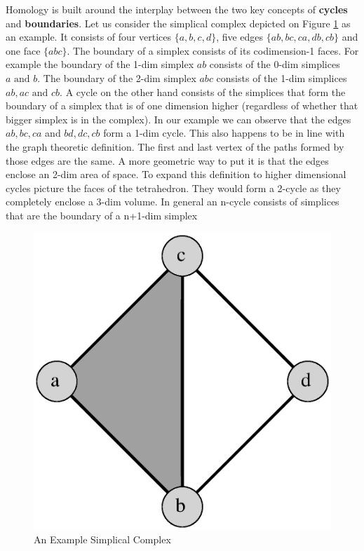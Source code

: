 Homology is built around the interplay between the two key concepts of \textbf{cycles} and \textbf{boundaries}. Let us consider the simplical complex depicted on Figure \ref{fig:hom-sc} as an example. It consists of four vertices $\{a, b, c, d\}$, five edges $\{ab, bc, ca, db, cb\}$ and one face $\{abc\}$. The boundary of a simplex consists of its codimension-1 faces. For example the boundary of the 1-dim simplex $ab$ consists of the 0-dim simplices $a \text{ and } b$. The boundary of the 2-dim simplex $abc$ consists of the 1-dim simplices $ab, ac \text{ and } cb$. A cycle on the other hand consists of the simplices that form the boundary of a simplex that is of one dimension higher (regardless of whether that bigger simplex is in the complex). In our example we can observe that the edges $ab, bc, ca$ and $bd, dc, cb$ form a 1-dim cycle.  This also happens to be in line with the graph theoretic definition. The first and last vertex of the paths formed by those edges are the same. A more geometric way to put it is that the edges enclose an 2-dim area of space.  To expand this definition to higher dimensional cycles picture the faces of the tetrahedron. They would form a 2-cycle as they completely enclose a 3-dim volume. In general an n-cycle consists of simplices that are the boundary of a n+1-dim simplex

\begin{figure}[h]%
    \centering
    \includegraphics[scale=0.4]{./images/chapter1/homology-sc.eps}%
    \caption{An Example Simplical Complex}%
    \label{fig:hom-sc}%
\end{figure}




